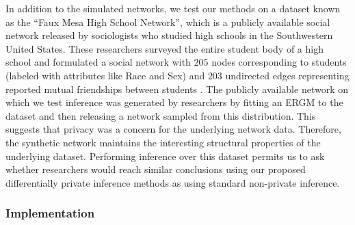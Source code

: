  	 In addition to the simulated networks, we test our methods on a dataset known as the ``Faux Mesa High School Network'', which is a publicly available social network released by sociologists who studied high schools in the Southwestern United States. These researchers surveyed the entire student body of a high school and formulated a social network with $205$ nodes corresponding to students (labeled with attributes like Race and Sex) and $203$ undirected edges representing reported mutual friendships between students \cite{ergm}. The publicly available network on which we test inference was generated by researchers by fitting an ERGM to the dataset and then releasing a network sampled from this distribution. This suggests that privacy was a concern for the underlying network data. Therefore, the synthetic network maintains the interesting structural properties of the underlying dataset. Performing inference over this dataset permits us to ask whether researchers would reach similar conclusions using our proposed differentially private inference methods as using standard non-private inference. 
 	 
  
\subsubsection*{Implementation}

